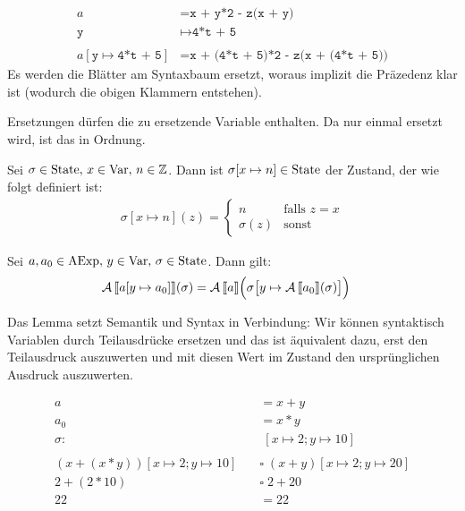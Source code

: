 \begin{example}
    \begin{align*}
        a & = \texttt{x + y*2 - z(x + y)} \\
        \texttt{y} & \mapsto \texttt{4*t + 5} \\
        \\
        a[\texttt{y} \mapsto \texttt{4*t + 5}] & = \texttt{x + (4*t + 5)*2 - z(x + (4*t + 5))}
    \end{align*}
    Es werden die Blätter am Syntaxbaum ersetzt, woraus implizit die Präzedenz klar ist (wodurch die obigen Klammern entstehen).

    Ersetzungen dürfen die zu ersetzende Variable enthalten. Da nur einmal ersetzt wird, ist das in Ordnung.
\end{example}

\begin{definition}\label{def:substitutionState}
    Sei $\sigma \in \operatorname{State}, \, x \in \operatorname{Var}, \, n \in \mathbb{Z}$. Dann ist $\sigma[x \mapsto n] \in \operatorname{State}$ der Zustand, der wie folgt definiert ist:
    \begin{align*}
        \sigma[x \mapsto n](z) = \begin{cases}
            n & \text{falls } z = x \\
            \sigma(z) & \text{sonst}
        \end{cases}
    \end{align*}
\end{definition}

\begin{lemma}
    Sei $a, a_0 \in \operatorname{AExp}, \, y \in \operatorname{Var}, \, \sigma \in \operatorname{State}$. Dann gilt:
    \begin{align*}
        \operatorname{\mathcal{A}}\mathrm{[}\kern-.14em\mathrm{[} a[y \mapsto a_0] \mathrm{]}\kern-.14em\mathrm{]}(\sigma) & = \operatorname{\mathcal{A}}\mathrm{[}\kern-.14em\mathrm{[} a \mathrm{]}\kern-.14em\mathrm{]} \Big( \sigma\big[y \mapsto \operatorname{\mathcal{A}}\mathrm{[}\kern-.14em\mathrm{[} a_0 \mathrm{]}\kern-.14em\mathrm{]}(\sigma)\big] \Big)
    \end{align*}
\end{lemma}

Das Lemma setzt Semantik und Syntax in Verbindung: Wir können syntaktisch Variablen durch Teilausdrücke ersetzen und das ist äquivalent dazu, erst den Teilausdruck auszuwerten und mit diesen Wert im Zustand den ursprünglichen Ausdruck auszuwerten.

\begin{example}
    \begin{align*}
    a & = x + y \\
    a_0 & = x * y \\
    \sigma: & \; [x \mapsto 2; y \mapsto 10] \\
    \\
    (x + (x * y))[x \mapsto 2; y \mapsto 10] \quad & \square\; (x + y)[x \mapsto 2; y \mapsto 20] \\
    2 + (2 * 10) \quad & \square\; 2 + 20 \\
    22 \quad & = 22
\end{align*}
\end{example}


